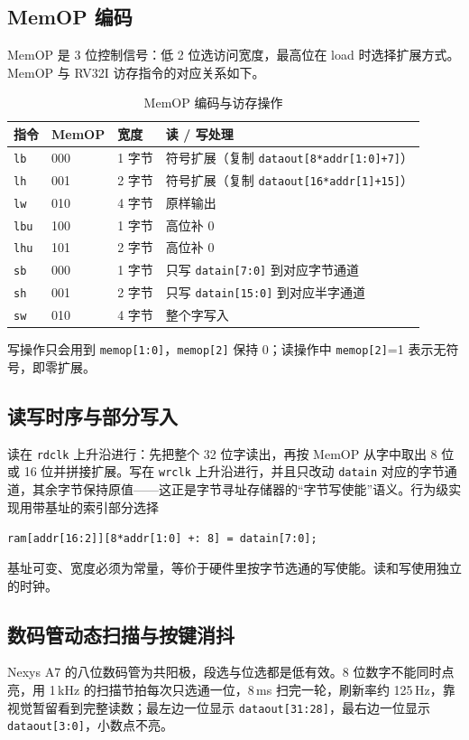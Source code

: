 \documentclass[12pt, a4paper]{ctexart}
\begin{document}
\subsection{MemOP 编码}
MemOP 是 3 位控制信号：低 2 位选访问宽度，最高位在 load 时选择扩展方式。MemOP 与 RV32I 访存指令的对应关系如下。

\begin{table}[htbp]
    \centering
    \caption{MemOP 编码与访存操作}
    \begin{tabular}{llll}
        \hline
        指令 & MemOP & 宽度 & 读 / 写处理 \\
        \hline
        \texttt{lb}  & 000 & 1 字节 & 符号扩展（复制 \texttt{dataout[8*addr[1:0]+7]}）\\
        \texttt{lh}  & 001 & 2 字节 & 符号扩展（复制 \texttt{dataout[16*addr[1]+15]}）\\
        \texttt{lw}  & 010 & 4 字节 & 原样输出 \\
        \texttt{lbu} & 100 & 1 字节 & 高位补 0 \\
        \texttt{lhu} & 101 & 2 字节 & 高位补 0 \\
        \hline
        \texttt{sb}  & 000 & 1 字节 & 只写 \texttt{datain[7:0]} 到对应字节通道 \\
        \texttt{sh}  & 001 & 2 字节 & 只写 \texttt{datain[15:0]} 到对应半字通道 \\
        \texttt{sw}  & 010 & 4 字节 & 整个字写入 \\
        \hline
    \end{tabular}
\end{table}

\noindent 写操作只会用到 \texttt{memop[1:0]}，\texttt{memop[2]} 保持 0；读操作中 \texttt{memop[2]}=1 表示无符号，即零扩展。

\subsection{读写时序与部分写入}
读在 \texttt{rdclk} 上升沿进行：先把整个 32 位字读出，再按 MemOP 从字中取出 8 位或 16 位并拼接扩展。写在 \texttt{wrclk} 上升沿进行，并且只改动 \texttt{datain} 对应的字节通道，其余字节保持原值——这正是字节寻址存储器的“字节写使能”语义。行为级实现用带基址的索引部分选择
\begin{center}
    \texttt{ram[addr[16:2]][8*addr[1:0] +: 8] = datain[7:0];}
\end{center}
基址可变、宽度必须为常量，等价于硬件里按字节选通的写使能。读和写使用独立的时钟。

\subsection{数码管动态扫描与按键消抖}
Nexys A7 的八位数码管为共阳极，段选与位选都是低有效。8 位数字不能同时点亮，用 1\,kHz 的扫描节拍每次只选通一位，8\,ms 扫完一轮，刷新率约 125\,Hz，靠视觉暂留看到完整读数；最左边一位显示 \texttt{dataout[31:28]}，最右边一位显示 \texttt{dataout[3:0]}，小数点不亮。
\end{document}
